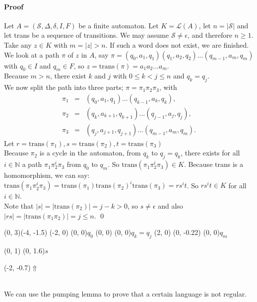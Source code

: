 \documentclass{article}
\begin{document}
\paragraph{Proof}
Let $A = (\mathcal{S}, \Delta, \delta, I, F)$ be a finite automaton. Let
$K = \mathcal{L}(A)$, let $n = |\mathcal{S}|$ and let trans be a sequence of
transitions. We may assume $\mathcal{S} \ne \epsilon$, and therefore
$n \ge 1$.\\
Take any $z \in K$ with $m = |z| > n$. If such a word does not exist, we are
finished. We look at a path $\pi$ of $z$ in $A$, say
$\pi = (q_0, a_1, q_1)(q_1, a_2, q_2)...(q_{m - 1}, a_m, q_m)$ with
$q_0 \in I$ and $q_m \in F$, so $z = \mathrm{trans}(\pi) = a_1a_2...a_m$.\\
Because $m > n$, there exist $k$ and $j$ with $0 \le k < j \le n$ and
$q_k = q_j$.\\
We now split the path into three parts; $\pi = \pi_1 \pi_2 \pi_3$, with
\begin{eqnarray*}
  \pi_1 &=& (q_0, a_1, q_1) ... (q_{k - 1}, a_k, q_k),\\
  \pi_2 &=& (q_k, a_{k + 1}, q_{k + 1}) ... (q_{j - 1}, a_j, q_j),\\
  \pi_3 &=& (q_j, a_{j + 1}, q_{j + 1}) ... (q_{m - 1}, a_m, q_m).
\end{eqnarray*}
Let $r = \mathrm{trans}(\pi_1), s = \mathrm{trans}(\pi_2),
     t = \mathrm{trans}(\pi_3)$\\
Because $\pi_2$ is a cycle in the automaton, from $q_k$ to $q_j = q_k$, there
exists for all $i \in \mathbb{N}$ a path $\pi_1 \pi_2^i \pi_3$ from $q_0$ to
$q_m$. So $\mathrm{trans}(\pi_1 \pi_2^i \pi_3) \in K$. Because trans is a
homomorphism, we can say:  $\mathrm{trans}(\pi_1 \pi_2^i \pi_3) =
\mathrm{trans}(\pi_1) \mathrm{trans}(\pi_2)^i \mathrm{trans}(\pi_3) = r s^i t$.
So $r s^i t \in K$ for all $i \in \mathbb{N}$.\\
Note that $|s| = |\mathrm{trans}(\pi_2)| = j - k > 0$, so $s \ne \epsilon$
and also $|rs| = |\mathrm{trans}(\pi_1 \pi_2)| = j \le n$. \qed\\
\begin{graph}(0, 3)(-4, -1.5)
  (-2, 0) (0, 0){\bs$q_0$\es}
  (0, 0) (0, 0){\bS$q_k=q_j$\eS}
  (2, 0)
    (0, -0.22){} (0, 0){\bs$q_m$\es}

   
  (0, 1) \freetext(0, 1.6){$s$}
   

  \freetext(-2, -0.7){$\Uparrow$}
\end{graph}\\
We can use the pumping lemma to prove that a certain language is not regular.
\end{document}
